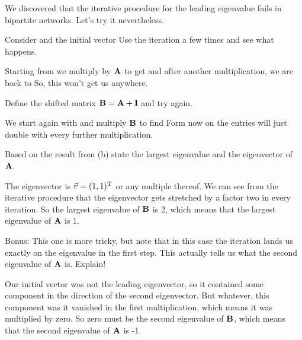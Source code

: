 

We discovered that the iterative procedure for the leading eigenvalue fails in bipartite networks. Let's try it nevertheless.

\subquestion
Consider
and the initial vector
Use the iteration 
a few times and see what happens.

\solution
Starting from 
we multiply by $\bf A$ to get  
and after another multiplication, we are back to 
So, this won't get us anywhere. 

\subquestion
Define the shifted matrix ${\bf B}={\bf A}+{\bf I}$ and try again.

\solution
We start again with 
and multiply $\bf B$ to find 
Form now on the entries will just double with every further multiplication. 

\subquestion
Based on the result from (b) state the largest eigenvalue and the eigenvector of $\bf A$. 

\solution
The eigenvector is $\vec{v}=(1,1)^{\rm T}$ or any multiple thereof. We can see from the iterative procedure that the eigenvector gets stretched by a factor two 
in every iteration. So the largest eigenvalue of $\bf B$ is 2, which means that the largest eigenvalue of $\bf A$ is 1.

\subquestion
Bonus: This one is more tricky, but note that in this case the iteration lands us exactly on the eigenvalue in the first step. This actually tells us what the second eigenvalue of $\bf A$ is. Explain!

\solution
Our initial vector was not the leading eigenvector, so it contained some component in the direction of the second eigenvector. But whatever, this component was it vanished in the first multiplication, which means it was multiplied by zero. So zero must be the second eigenvalue of $\bf B$, which means that the second eigenvalue of $\bf A$ is -1. 

